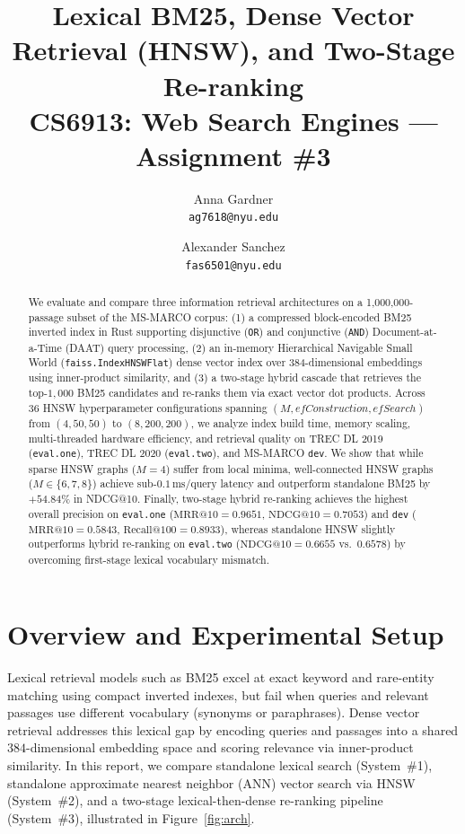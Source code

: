 \documentclass[11pt]{article}
\title{Lexical BM25, Dense Vector Retrieval (HNSW), and Two-Stage Re-ranking\\[0.5em]
    \large CS6913: Web Search Engines --- Assignment \#3}
\author{
    Anna Gardner\\
    \texttt{ag7618@nyu.edu}
    \and
    Alexander Sanchez\\
    \texttt{fas6501@nyu.edu}
}
\date{}
\begin{document}
\maketitle

\begin{abstract}
We evaluate and compare three information retrieval architectures on a 1,000,000-passage subset of the MS-MARCO corpus: (1) a compressed block-encoded BM25 inverted index in Rust supporting disjunctive (\texttt{OR}) and conjunctive (\texttt{AND}) Document-at-a-Time (DAAT) query processing, (2) an in-memory Hierarchical Navigable Small World (\texttt{faiss.IndexHNSWFlat}) dense vector index over 384-dimensional embeddings using inner-product similarity, and (3) a two-stage hybrid cascade that retrieves the top-$1{,}000$ BM25 candidates and re-ranks them via exact vector dot products. Across 36 HNSW hyperparameter configurations spanning $(M, \mathit{efConstruction}, \mathit{efSearch})$ from $(4, 50, 50)$ to $(8, 200, 200)$, we analyze index build time, memory scaling, multi-threaded hardware efficiency, and retrieval quality on TREC DL 2019 (\texttt{eval.one}), TREC DL 2020 (\texttt{eval.two}), and MS-MARCO \texttt{dev}. We show that while sparse HNSW graphs ($M=4$) suffer from local minima, well-connected HNSW graphs ($M \in \{6,7,8\}$) achieve sub-$0.1\,\text{ms/query}$ latency and outperform standalone BM25 by $+54.84\%$ in NDCG@10. Finally, two-stage hybrid re-ranking achieves the highest overall precision on \texttt{eval.one} ($\text{MRR@10}=0.9651$, $\text{NDCG@10}=0.7053$) and \texttt{dev} ($\text{MRR@10}=0.5843$, $\text{Recall@100}=0.8933$), whereas standalone HNSW slightly outperforms hybrid re-ranking on \texttt{eval.two} ($\text{NDCG@10}=0.6655$ vs.\ $0.6578$) by overcoming first-stage lexical vocabulary mismatch.
\end{abstract}

\section{Overview and Experimental Setup}

Lexical retrieval models such as BM25 excel at exact keyword and rare-entity matching using compact inverted indexes, but fail when queries and relevant passages use different vocabulary (synonyms or paraphrases). Dense vector retrieval addresses this lexical gap by encoding queries and passages into a shared $384$-dimensional embedding space and scoring relevance via inner-product similarity. In this report, we compare standalone lexical search (System~\#1), standalone approximate nearest neighbor (ANN) vector search via HNSW (System~\#2), and a two-stage lexical-then-dense re-ranking pipeline (System~\#3), illustrated in Figure~\ref{fig:arch}.
\end{document}
